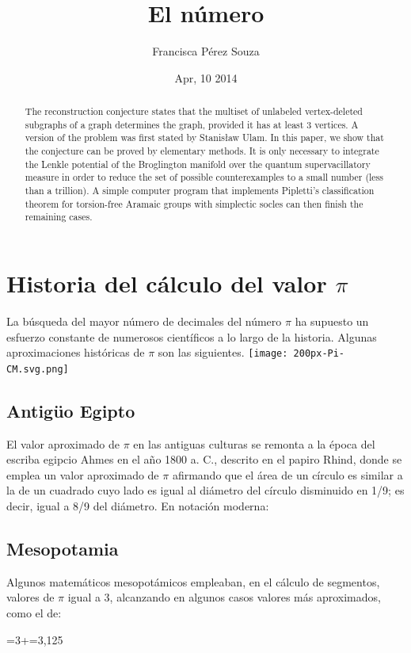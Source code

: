 \documentclass[spanish,a4paper,11pt]{article}
\title{El número \pi}
\author{Francisca Pérez Souza}
\date{Apr, 10 2014}
\newcommand{\PI}{{$\pi$ }}
\begin{document}
\maketitle

\begin{abstract}
The reconstruction conjecture states that the multiset of unlabeled
vertex-deleted subgraphs of a graph determines the graph, provided it
has at least 3 vertices. A version of the problem was first stated
by Stanis\l aw Ulam. In this paper, we show that the conjecture can
be proved by elementary methods. It is only necessary to integrate
the Lenkle potential of the Broglington manifold over the quantum
supervacillatory measure in order to reduce the set of possible
counterexamples to a small number (less than a trillion). A simple
computer program that implements Pipletti's classification theorem
for torsion-free Aramaic groups with simplectic socles can then
finish the remaining cases.
\end{abstract}

\section{Historia del cálculo del valor \PI}
La búsqueda del mayor número de decimales del número \PI ha supuesto un esfuerzo constante
de numerosos científicos a lo largo de la historia. Algunas aproximaciones históricas de \PI son las siguientes.
\texttt{[image: 200px-Pi-CM.svg.png]}

\subsection{Antigüo Egipto}
El valor aproximado de \PI en las antiguas culturas se remonta a la época del escriba egipcio Ahmes en el año 1800 a. C.,
descrito en el papiro Rhind\cite{Robins}, donde se emplea un valor aproximado de \PI afirmando que el área de un círculo
es similar a la de un cuadrado cuyo lado es igual al diámetro del círculo disminuido en 1/9; es decir, igual a 8/9 del
diámetro. En notación moderna:

\subsection{Mesopotamia}
Algunos matemáticos mesopotámicos empleaban, en el cálculo de segmentos, valores de \PI igual a 3, alcanzando en algunos
casos valores más aproximados, como el de:
\centerline {\pi}=3+=3,125
\end{document}
